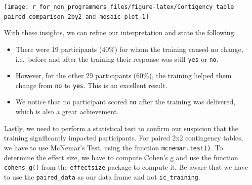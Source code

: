 \documentclass[
]{book}
\newenvironment{Shaded}{\begin{snugshade}}{\end{snugshade}}
\newcommand{\CommentTok}[1]{\textcolor[rgb]{0.56,0.35,0.01}{\textit{#1}}}
\newcommand{\DocumentationTok}[1]{\textcolor[rgb]{0.56,0.35,0.01}{\textbf{\textit{#1}}}}
\newcommand{\FunctionTok}[1]{\textcolor[rgb]{0.00,0.00,0.00}{#1}}
\newcommand{\NormalTok}[1]{#1}
\newcommand{\SpecialCharTok}[1]{\textcolor[rgb]{0.00,0.00,0.00}{#1}}
\begin{document}
\begin{center}\texttt{[image: r\_for\_non\_programmers\_files/figure-latex/Contigency table paired comparison 2by2 and mosaic plot-1]} \end{center}

With these insights, we can refine our interpretation and state the following:

\begin{itemize}
\item
  There were 19 participants (40\%) for whom the training caused no change, i.e.~before and after the training their response was still \texttt{yes} or \texttt{no}.
\item
  However, for the other 29 participants (60\%), the training helped them change from \texttt{no} to \texttt{yes}. This is an excellent result.
\item
  We notice that no participant scored \texttt{no} after the training was delivered, which is also a great achievement.
\end{itemize}

Lastly, we need to perform a statistical test to confirm our suspicion that the training significantly impacted participants. For paired 2x2 contingency tables, we have to use McNemar's Test, using the function \texttt{mcnemar.test()}. To determine the effect size, we have to compute Cohen's g and use the function \texttt{cohens\_g()} from the \texttt{effectsize} package to compute it. Be aware that we have to use the \texttt{paired\_data} as our data frame and not \texttt{ic\_training}.

\begin{Shaded}
\end{Shaded}
\end{document}
